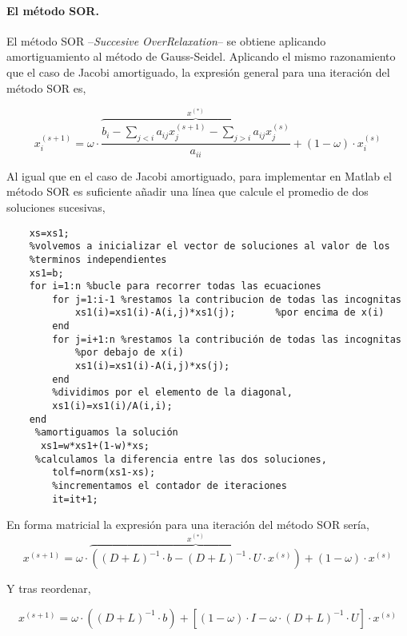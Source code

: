 \paragraph{El método SOR.} El método SOR --\emph{Succesive OverRelaxation}-- se obtiene aplicando amortiguamiento al método de Gauss-Seidel. Aplicando el mismo razonamiento que el caso de Jacobi amortiguado, la expresión general para una iteración del método SOR es,

\begin{equation*}
x_i^{(s+1)}=\omega\cdot \overbrace{\frac{b_i-\sum_{j< i}a_{ij}x_j^{(s+1)}-\sum_{j> i}a_{ij}x_j^{(s)}}{a_{ii}}}^{x^{(*)}}+(1-\omega)\cdot x_i^{(s)}
\end{equation*}

Al igual que en el caso de Jacobi amortiguado, para implementar en Matlab el método SOR es suficiente añadir una línea que calcule el promedio de dos soluciones sucesivas,

\begin{verbatim}
    xs=xs1;
    %volvemos a inicializar el vector de soluciones al valor de los
    %terminos independientes
    xs1=b; 
    for i=1:n %bucle para recorrer todas las ecuaciones
        for j=1:i-1 %restamos la contribucion de todas las incognitas
            xs1(i)=xs1(i)-A(i,j)*xs1(j);       %por encima de x(i)
        end
        for j=i+1:n %restamos la contribución de todas las incognitas
            %por debajo de x(i)
            xs1(i)=xs1(i)-A(i,j)*xs(j);
        end
        %dividimos por el elemento de la diagonal,
        xs1(i)=xs1(i)/A(i,i);
    end
     %amortiguamos la solución
      xs1=w*xs1+(1-w)*xs;
     %calculamos la diferencia entre las dos soluciones,
        tolf=norm(xs1-xs);
        %incrementamos el contador de iteraciones
        it=it+1;
\end{verbatim}

En forma matricial la expresión para una iteración del método SOR sería,
\begin{equation*}
x^{(s+1)}= \omega\cdot\overbrace{\left((D+L)^{-1}\cdot b-(D+L)^{-1}\cdot U\cdot x^{(s)}\right)}^{x^{(*)}}+(1-\omega)\cdot x^{(s)}
\end{equation*}

Y tras reordenar,

\begin{equation*}
x^{(s+1)}= \omega\cdot\left((D+L)^{-1}\cdot b\right)+\left[(1-\omega)\cdot I-\omega\cdot(D+L)^{-1}\cdot U\right]\cdot x^{(s)}
\end{equation*}

